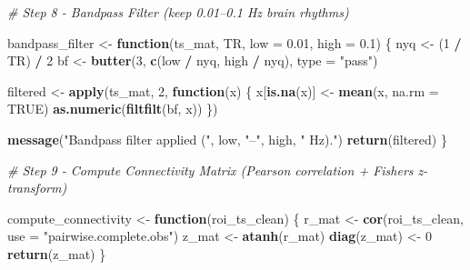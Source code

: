 \documentclass[
]{article}
\newenvironment{Shaded}{\begin{snugshade}}{\end{snugshade}}
\newcommand{\AttributeTok}[1]{\textcolor[rgb]{0.13,0.29,0.53}{#1}}
\newcommand{\CommentTok}[1]{\textcolor[rgb]{0.56,0.35,0.01}{\textit{#1}}}
\newcommand{\ConstantTok}[1]{\textcolor[rgb]{0.56,0.35,0.01}{#1}}
\newcommand{\ControlFlowTok}[1]{\textcolor[rgb]{0.13,0.29,0.53}{\textbf{#1}}}
\newcommand{\DecValTok}[1]{\textcolor[rgb]{0.00,0.00,0.81}{#1}}
\newcommand{\FloatTok}[1]{\textcolor[rgb]{0.00,0.00,0.81}{#1}}
\newcommand{\FunctionTok}[1]{\textcolor[rgb]{0.13,0.29,0.53}{\textbf{#1}}}
\newcommand{\NormalTok}[1]{#1}
\newcommand{\OtherTok}[1]{\textcolor[rgb]{0.56,0.35,0.01}{#1}}
\newcommand{\SpecialCharTok}[1]{\textcolor[rgb]{0.81,0.36,0.00}{\textbf{#1}}}
\newcommand{\StringTok}[1]{\textcolor[rgb]{0.31,0.60,0.02}{#1}}
\begin{document}
\begin{Shaded}
\begin{Highlighting}[]
\CommentTok{\# Step 8 {-} Bandpass Filter (keep 0.01–0.1 Hz brain rhythms)}

\NormalTok{bandpass\_filter }\OtherTok{\textless{}{-}} \ControlFlowTok{function}\NormalTok{(ts\_mat, TR, }\AttributeTok{low =} \FloatTok{0.01}\NormalTok{, }\AttributeTok{high =} \FloatTok{0.1}\NormalTok{) \{}
\NormalTok{  nyq }\OtherTok{\textless{}{-}}\NormalTok{ (}\DecValTok{1} \SpecialCharTok{/}\NormalTok{ TR) }\SpecialCharTok{/} \DecValTok{2}
\NormalTok{  bf  }\OtherTok{\textless{}{-}} \FunctionTok{butter}\NormalTok{(}\DecValTok{3}\NormalTok{, }\FunctionTok{c}\NormalTok{(low }\SpecialCharTok{/}\NormalTok{ nyq, high }\SpecialCharTok{/}\NormalTok{ nyq), }\AttributeTok{type =} \StringTok{"pass"}\NormalTok{)}

\NormalTok{  filtered }\OtherTok{\textless{}{-}} \FunctionTok{apply}\NormalTok{(ts\_mat, }\DecValTok{2}\NormalTok{, }\ControlFlowTok{function}\NormalTok{(x) \{}
\NormalTok{    x[}\FunctionTok{is.na}\NormalTok{(x)] }\OtherTok{\textless{}{-}} \FunctionTok{mean}\NormalTok{(x, }\AttributeTok{na.rm =} \ConstantTok{TRUE}\NormalTok{)}
    \FunctionTok{as.numeric}\NormalTok{(}\FunctionTok{filtfilt}\NormalTok{(bf, x))}
\NormalTok{  \})}

  \FunctionTok{message}\NormalTok{(}\StringTok{"Bandpass filter applied ("}\NormalTok{, low, }\StringTok{"–"}\NormalTok{, high, }\StringTok{" Hz)."}\NormalTok{)}
  \FunctionTok{return}\NormalTok{(filtered)}
\NormalTok{\}}
\end{Highlighting}
\end{Shaded}

\begin{Shaded}
\begin{Highlighting}[]
\CommentTok{\# Step 9 {-} Compute Connectivity Matrix (Pearson correlation + Fisher\textquotesingle{}s z{-}transform)}

\NormalTok{compute\_connectivity }\OtherTok{\textless{}{-}} \ControlFlowTok{function}\NormalTok{(roi\_ts\_clean) \{}
\NormalTok{  r\_mat }\OtherTok{\textless{}{-}} \FunctionTok{cor}\NormalTok{(roi\_ts\_clean, }\AttributeTok{use =} \StringTok{"pairwise.complete.obs"}\NormalTok{)}
\NormalTok{  z\_mat }\OtherTok{\textless{}{-}} \FunctionTok{atanh}\NormalTok{(r\_mat)}
  \FunctionTok{diag}\NormalTok{(z\_mat) }\OtherTok{\textless{}{-}} \DecValTok{0}
  \FunctionTok{return}\NormalTok{(z\_mat)}
\NormalTok{\}}
\end{Highlighting}
\end{Shaded}
\end{document}
